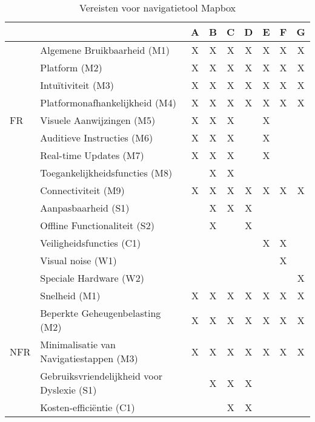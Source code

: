 \begin{table}[ht]
    \centering
    \caption{Vereisten voor navigatietool Mapbox}
    \label{tab:mapbox_requirements}
    \begin{tabular}{|l|l|c|c|c|c|c|c|c|}
        \hline
        & \textbf{} & \textbf{A} & \textbf{B} & \textbf{C} & \textbf{D} & \textbf{E} & \textbf{F} & \textbf{G} \\ \hline
        \multirow{9}{*}{FR} & Algemene Bruikbaarheid (M1) & X & X & X & X & X & X & X \\ \cline{2-9}
        & Platform (M2) & X & X & X & X & X & X & X \\ \cline{2-9}
        & Intuïtiviteit (M3) & X & X & X & X & X & X & X \\ \cline{2-9}
        & Platformonafhankelijkheid (M4) & X & X & X & X & X & X & X \\ \cline{2-9}
        & Visuele Aanwijzingen (M5) & X & X & X &  & X &  &  \\ \cline{2-9}
        & Auditieve Instructies (M6) & X & X & X &  & X &  &  \\ \cline{2-9}
        & Real-time Updates (M7) & X & X & X &  & X &  &  \\ \cline{2-9}
        & Toegankelijkheidsfuncties (M8) &  & X & X &  &  &  &  \\ \cline{2-9}
        & Connectiviteit (M9) & X & X & X & X & X & X & X \\ \cline{2-9}
        & Aanpasbaarheid (S1) &  & X & X & X &  &  &  \\ \cline{2-9}
        & Offline Functionaliteit (S2) &  & X &  & X &  &  &  \\ \cline{2-9}
        & Veiligheidsfuncties (C1) &  &  &  &  & X & X &  \\ \cline{2-9}
        & Visual noise (W1) &  &  &  &  &  & X &  \\ \cline{2-9}
        & Speciale Hardware (W2) &  &  &  &  &  &  & X \\ \hline
        \multirow{5}{*}{NFR} & Snelheid (M1) & X & X & X & X & X & X & X \\ \cline{2-9}
        & Beperkte Geheugenbelasting (M2) & X & X & X & X & X & X & X \\ \cline{2-9}
        & Minimalisatie van Navigatiestappen (M3) & X & X & X & X & X & X & X \\ \cline{2-9}
        & Gebruiksvriendelijkheid voor Dyslexie (S1) &  & X & X & X &  &  &  \\ \cline{2-9}
        & Kosten-efficiëntie (C1) &  &  & X & X &  &  &  \\ \hline
    \end{tabular}
\end{table}

